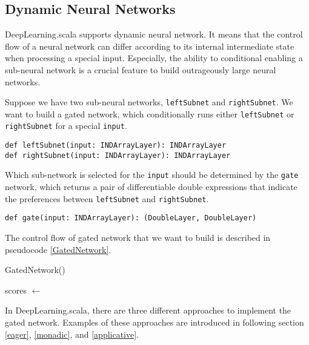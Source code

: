 \subsection{Dynamic Neural Networks}

DeepLearning.scala supports dynamic neural network. It means that the control flow of a neural network can differ according to its internal intermediate state when processing a special input. Especially, the ability to conditional enabling a sub-neural network is a crucial feature to build outrageously large neural networks\cite{shazeer2017outrageously}.

Suppose we have two sub-neural networks, \lstinline{leftSubnet} and \lstinline{rightSubnet}. We want to build a gated network, which conditionally runs either \lstinline{leftSubnet} or \lstinline{rightSubnet} for a special \lstinline{input}.

\begin{lstlisting}[caption={Predefined sub-networks}]
def leftSubnet(input: INDArrayLayer): INDArrayLayer
def rightSubnet(input: INDArrayLayer): INDArrayLayer
\end{lstlisting}

Which sub-network is selected for the \lstinline{input} should be determined by the \lstinline{gate} network, which returns a pair of differentiable double expressions that indicate the preferences between \lstinline{leftSubnet} and \lstinline{rightSubnet}.

\begin{lstlisting}[caption={Predefined gate network}]
def gate(input: INDArrayLayer): (DoubleLayer, DoubleLayer)
\end{lstlisting}

The control flow of gated network that we want to build is described in pseudocode \ref{GatedNetwork}.

\begin{function}[H]
  \caption{GatedNetwork()\label{GatedNetwork}}
  scores $\leftarrow$ \;
\end{function}

In DeepLearning.scala, there are three different approaches to implement the gated network. Examples of these approaches are introduced in following section \ref{eager}, \ref{monadic}, and \ref{applicative}.

